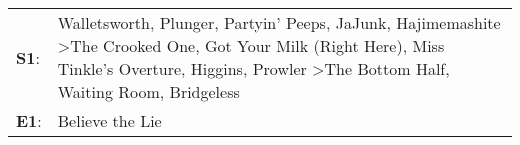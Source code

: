 \begin{supertabular}{p{0.03\textwidth}p{0.92\textwidth}}
 \textbf{S1}:  &  Walletsworth\textsuperscript{}, \enspace Plunger\textsuperscript{}, \enspace Partyin' Peeps\textsuperscript{}, \enspace JaJunk\textsuperscript{}, \enspace Hajimemashite\textsuperscript{} \textgreater \enspace The Crooked One\textsuperscript{}, \enspace Got Your Milk (Right Here)\textsuperscript{}, \enspace Miss Tinkle's Overture\textsuperscript{}, \enspace Higgins\textsuperscript{}, \enspace Prowler\textsuperscript{} \textgreater \enspace The Bottom Half\textsuperscript{}, \enspace Waiting Room\textsuperscript{}, \enspace Bridgeless\textsuperscript{}  \enspace  \\
 \textbf{E1}:  &                                                                                                                                                                                                                                                                                                                                                                                                                                                                                                                                             Believe the Lie\textsuperscript{}  \enspace  \\
\end{supertabular}
